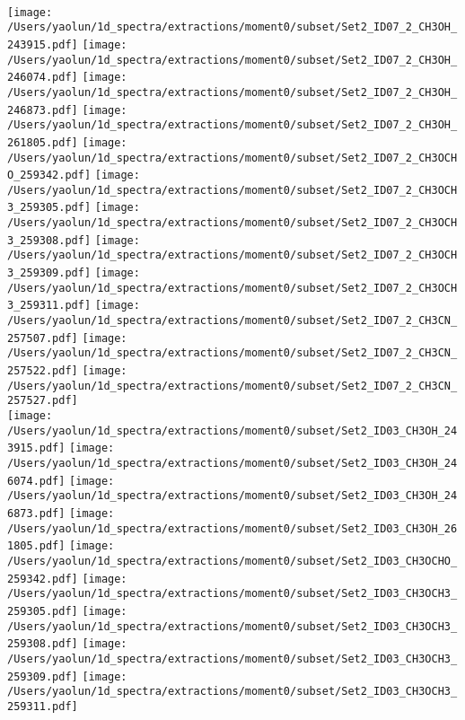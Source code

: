 \begin{figure*}[htbp!]
  \\
  \texttt{[image: /Users/yaolun/1d\_spectra/extractions/moment0/subset/Set2\_ID07\_2\_CH3OH\_243915.pdf]}
  \texttt{[image: /Users/yaolun/1d\_spectra/extractions/moment0/subset/Set2\_ID07\_2\_CH3OH\_246074.pdf]}
  \texttt{[image: /Users/yaolun/1d\_spectra/extractions/moment0/subset/Set2\_ID07\_2\_CH3OH\_246873.pdf]}
  \texttt{[image: /Users/yaolun/1d\_spectra/extractions/moment0/subset/Set2\_ID07\_2\_CH3OH\_261805.pdf]}
  \texttt{[image: /Users/yaolun/1d\_spectra/extractions/moment0/subset/Set2\_ID07\_2\_CH3OCHO\_259342.pdf]}
  \texttt{[image: /Users/yaolun/1d\_spectra/extractions/moment0/subset/Set2\_ID07\_2\_CH3OCH3\_259305.pdf]}
  \texttt{[image: /Users/yaolun/1d\_spectra/extractions/moment0/subset/Set2\_ID07\_2\_CH3OCH3\_259308.pdf]}
  \texttt{[image: /Users/yaolun/1d\_spectra/extractions/moment0/subset/Set2\_ID07\_2\_CH3OCH3\_259309.pdf]}
  \texttt{[image: /Users/yaolun/1d\_spectra/extractions/moment0/subset/Set2\_ID07\_2\_CH3OCH3\_259311.pdf]}
  \texttt{[image: /Users/yaolun/1d\_spectra/extractions/moment0/subset/Set2\_ID07\_2\_CH3CN\_257507.pdf]}
  \texttt{[image: /Users/yaolun/1d\_spectra/extractions/moment0/subset/Set2\_ID07\_2\_CH3CN\_257522.pdf]}
  \texttt{[image: /Users/yaolun/1d\_spectra/extractions/moment0/subset/Set2\_ID07\_2\_CH3CN\_257527.pdf]}
  \\
  \texttt{[image: /Users/yaolun/1d\_spectra/extractions/moment0/subset/Set2\_ID03\_CH3OH\_243915.pdf]}
  \texttt{[image: /Users/yaolun/1d\_spectra/extractions/moment0/subset/Set2\_ID03\_CH3OH\_246074.pdf]}
  \texttt{[image: /Users/yaolun/1d\_spectra/extractions/moment0/subset/Set2\_ID03\_CH3OH\_246873.pdf]}
  \texttt{[image: /Users/yaolun/1d\_spectra/extractions/moment0/subset/Set2\_ID03\_CH3OH\_261805.pdf]}
  \texttt{[image: /Users/yaolun/1d\_spectra/extractions/moment0/subset/Set2\_ID03\_CH3OCHO\_259342.pdf]}
  \texttt{[image: /Users/yaolun/1d\_spectra/extractions/moment0/subset/Set2\_ID03\_CH3OCH3\_259305.pdf]}
  \texttt{[image: /Users/yaolun/1d\_spectra/extractions/moment0/subset/Set2\_ID03\_CH3OCH3\_259308.pdf]}
  \texttt{[image: /Users/yaolun/1d\_spectra/extractions/moment0/subset/Set2\_ID03\_CH3OCH3\_259309.pdf]}
  \texttt{[image: /Users/yaolun/1d\_spectra/extractions/moment0/subset/Set2\_ID03\_CH3OCH3\_259311.pdf]}

\end{figure*}
